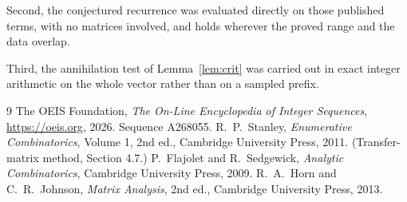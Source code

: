\documentclass[11pt,a4paper]{article}
\theoremstyle{plain}
\theoremstyle{definition}
\begin{document}
Second, the conjectured recurrence was evaluated directly on those published terms, with no
matrices involved, and holds wherever the proved range and the data overlap.

Third, the annihilation test of Lemma~\ref{lem:crit} was carried out in exact integer
arithmetic on the whole vector rather than on a sampled prefix.

\begin{thebibliography}{9}
 The OEIS Foundation, \emph{The On-Line Encyclopedia of Integer
Sequences}, \url{https://oeis.org}, 2026. Sequence A268055.
 R.~P.~Stanley, \emph{Enumerative Combinatorics}, Volume 1, 2nd ed.,
Cambridge University Press, 2011. (Transfer-matrix method, Section 4.7.)
 P.~Flajolet and R.~Sedgewick, \emph{Analytic Combinatorics}, Cambridge
University Press, 2009.
 R.~A.~Horn and C.~R.~Johnson, \emph{Matrix Analysis}, 2nd ed., Cambridge
University Press, 2013.
\end{thebibliography}
\end{document}
